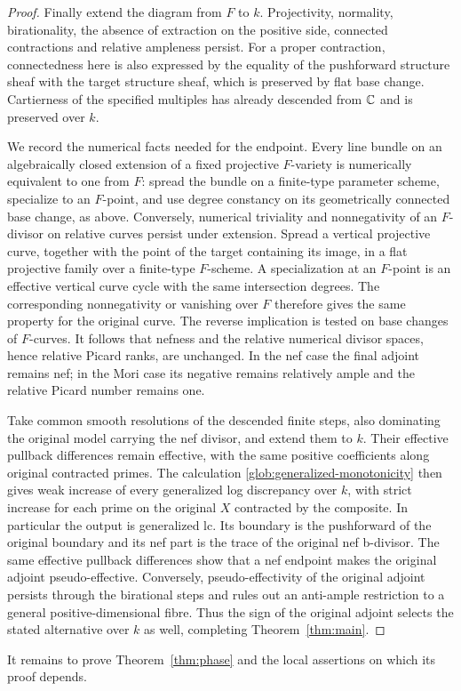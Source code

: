 \begin{proof}
Finally extend the diagram from $F$ to $k$.  Projectivity, normality,
birationality, the absence of extraction on the positive side,
connected contractions and relative ampleness persist.  For a proper
contraction, connectedness here is also expressed by the equality of
the pushforward structure sheaf with the target structure sheaf, which
is preserved by flat base change.  Cartierness of the specified
multiples has already descended from $\mathbb C$ and is preserved over $k$.

We record the numerical facts needed for the endpoint.  Every line
bundle on an algebraically closed extension of a fixed projective
$F$-variety is numerically equivalent to one from $F$: spread the bundle
on a finite-type parameter scheme, specialize to an $F$-point, and use
degree constancy on its geometrically connected base change, as above.
Conversely, numerical triviality and nonnegativity of an $F$-divisor on
relative curves persist under extension.  Spread a vertical projective
curve, together with the point of the target containing its image, in
a flat projective family over a finite-type $F$-scheme.  A specialization
at an $F$-point is an effective vertical curve cycle with the same
intersection degrees.  The corresponding nonnegativity or vanishing
over $F$ therefore gives the same property for the original curve.
The reverse implication is tested on base changes of $F$-curves.
It follows that nefness and the relative numerical divisor spaces,
hence relative Picard ranks, are unchanged.  In the nef case the final
adjoint remains nef; in the Mori case its negative remains relatively
ample and the relative Picard number remains one.

Take common smooth resolutions of the descended finite steps, also
dominating the original model carrying the nef divisor, and extend them
to $k$.  Their effective pullback differences remain effective, with
the same positive coefficients along original contracted primes.
The calculation \eqref{glob:generalized-monotonicity} then gives weak
increase of every generalized log discrepancy over $k$, with strict
increase for each prime on the original $X$ contracted by the composite.
In particular the output is generalized lc.  Its boundary is the
pushforward of the original boundary and its nef part is the trace of
the original nef b-divisor. The same effective pullback differences show
that a nef endpoint makes the original adjoint pseudo-effective.
Conversely, pseudo-effectivity
of the original adjoint persists through the birational steps and rules
out an anti-ample restriction to a general positive-dimensional fibre.
Thus the sign of the original adjoint selects the stated alternative
over $k$ as well, completing Theorem~\ref{thm:main}.
\end{proof}

It remains to prove Theorem~\ref{thm:phase} and the local assertions on
which its proof depends.
